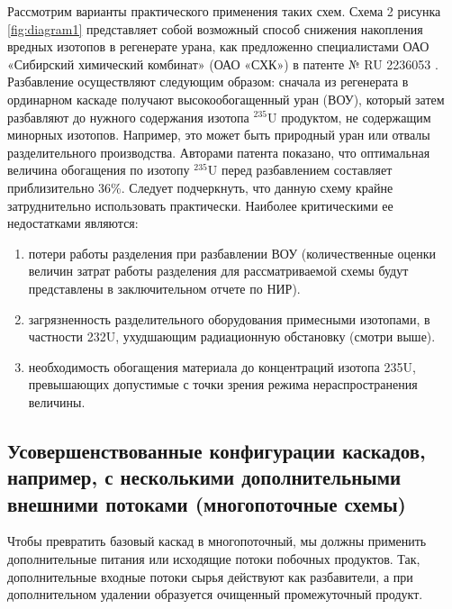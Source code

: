 Рассмотрим варианты практического применения таких схем. Схема 2 рисунка \ref{fig:diagram1} представляет собой возможный способ снижения накопления вредных изотопов в регенерате урана, как предложенно специалистами ОАО «Сибирский химический комбинат» (ОАО «СХК») в патенте № RU 2236053 \cite{SposobIzotopnogoVosstanovleniyaa}. Разбавление осуществляют следующим образом: сначала из регенерата в ординарном каскаде получают высокообогащенный уран (ВОУ), который затем разбавляют до нужного содержания изотопа $^{235}$U продуктом, не содержащим минорных изотопов. Например, это может быть природный уран или отвалы разделительного производства. Авторами патента показано, что оптимальная величина обогащения по изотопу $^{235}$U перед разбавлением составляет приблизительно 36\%. Следует подчеркнуть, что данную схему крайне затруднительно использовать практически. Наиболее критическими ее недостатками являются: 
\begin{enumerate}
  \item потери работы разделения при разбавлении ВОУ (количественные оценки величин затрат работы разделения для рассматриваемой схемы будут представлены в заключительном отчете по НИР).
  \item загрязненность разделительного оборудования примесными изотопами, в частности 232U, ухудшающим радиационную обстановку (смотри выше).
  \item необходимость обогащения материала до концентраций изотопа 235U, превышающих допустимые с точки зрения режима нераспространения величины.
\end{enumerate}

\subsection{Усовершенствованные конфигурации каскадов, например, с несколькими дополнительными внешними потоками (многопоточные схемы)}\label{sec:ch1/sec2.3}
Чтобы превратить базовый каскад в многопоточный, мы должны применить дополнительные питания или исходящие потоки побочных продуктов. Так, дополнительные входные потоки сырья действуют как разбавители, а при дополнительном удалении образуется очищенный промежуточный продукт.

